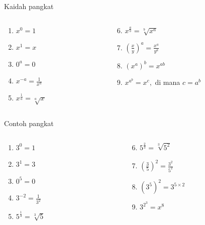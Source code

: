 \documentclass[
  ignorenonframetext,
]{beamer}
\providecommand{\tightlist}{%
  \setlength{\itemsep}{0pt}\setlength{\parskip}{0pt}}\usepackage{longtable,booktabs,array}
\begin{document}
\begin{frame}{Kaidah pangkat}
\label{kaidah-pangkat}
\begin{columns}[T]
\begin{column}{0.47\textwidth}
\begin{enumerate}
\tightlist
\item
  \(x^0=1\)
\item
  \(x^1=x\)
\item
  \(0^a=0\)
\item
  \(x^{-a}=\frac{1}{x^a}\)
\item
  \(x^{\frac{1}{a}}=\sqrt[a]{x}\)
\end{enumerate}
\end{column}

\begin{column}{0.47\textwidth}
\begin{enumerate}
\setcounter{enumi}{5}
\tightlist
\item
  \(x^{\frac{a}{b}}=\sqrt[b]{x^a}\)
\item
  \({\left(\frac{x}{y}\right)}^a=\frac{x^a}{y^a}\)
\item
  \(\left(x^a\right)^b=x^{ab}\)
\item
  \(x^{a^b}=x^c,\) di mana \(c=a^b\)
\end{enumerate}
\end{column}
\end{columns}
\end{frame}

\begin{frame}{Contoh pangkat}
\label{contoh-pangkat}
\begin{columns}[T]
\begin{column}{0.47\textwidth}
\begin{enumerate}
\tightlist
\item
  \(3^0=1\)
\item
  \(3^1=3\)
\item
  \(0^5=0\)
\item
  \(3^{-2}=\frac{1}{3^2}\)
\item
  \(5^{\frac{1}{3}}=\sqrt[3]{5}\)
\end{enumerate}
\end{column}

\begin{column}{0.47\textwidth}
\begin{enumerate}
\setcounter{enumi}{5}
\tightlist
\item
  \(5^{\frac{2}{3}}=\sqrt[3]{5^2}\)
\item
  \({\left(\frac{3}{5}\right)}^2=\frac{3^2}{5^2}\)
\item
  \(\left(3^5\right)^2=3^{5\times 2}\)
\item
  \(3^{2^3}=x^8\)
\end{enumerate}
\end{column}
\end{columns}
\end{frame}
\end{document}
